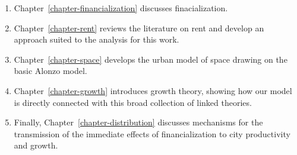 \begin{enumerate}
    \item Chapter~\ref{chapter-financialization} discusses finacialization. %
    \item Chapter~\ref{chapter-rent} reviews the literature on rent and develop an approach suited to the analysis for this work.
    \item Chapter~\ref{chapter-space} develops the urban model of space drawing on the basic Alonzo model.
    \item Chapter~\ref{chapter-growth} introduces growth theory, showing how our model is directly connected with this broad collection of linked theories. %
    \item Finally, Chapter~\ref{chapter-distribution} discusses mechanisms for the transmission of the immediate effects of financialization to city productivity and growth.
\end{enumerate}
 
